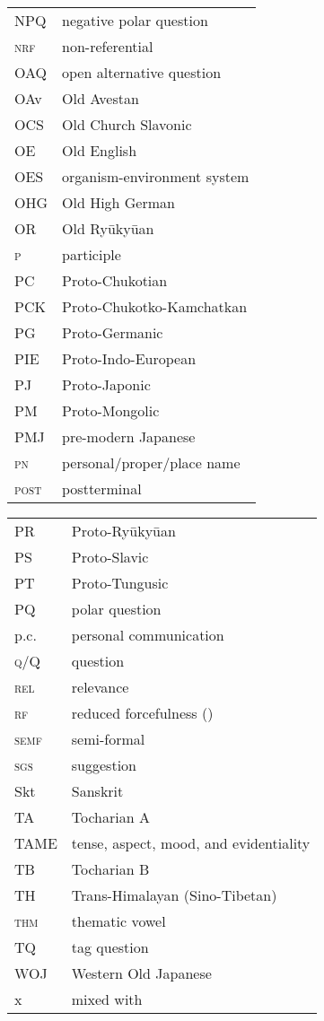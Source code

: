 \begin{tabularx}{.45\textwidth}{lQ} 
NPQ & negative {polar question}\\
\textsc{nrf} & non-referential \citep{Huang1996}\\
OAQ & open {alternative question}\\
OAv & Old {Avestan}\\
OCS & {Old Church Slavonic}\\
OE & Old {English}\\
OES & {organism-environment system}\\
OHG & Old High {German}\\
OR & Old Ry\=uky\=uan\\
\textsc{p} & participle\\
PC & Proto-{Chukotian}\\
PCK & Proto-{Chukotko-Kamchatkan}\\
PG & Proto-{Germanic}\\
PIE & {Proto-Indo-European}\\
PJ & {Proto-Japonic}\\
PM & Proto-{Mongolic}\\
PMJ & pre-modern {Japanese}\\
\textsc{pn} & personal/proper/place name\\
\textsc{post} & postterminal \citep[151]{Ragagnin2011}\\
\end{tabularx}
\begin{tabularx}{.45\textwidth}{lQ}  
PR & Proto-Ry\=uky\=uan\\
PS & {Proto-Slavic}\\
PT & {Proto-Tungusic}\\
PQ & {polar question}\\
p.c. & personal communication\\
\textsc{q}/Q & question\\
\textsc{rel} & relevance \citep{Shapiro2010}\\
\textsc{rf} & reduced forcefulness (\citealt{LiThompson1981})\\
\textsc{semf} & semi-formal\\
\textsc{sgs} & suggestion \citep{Miyara2015}\\
Skt & {Sanskrit}\\
TA & {Tocharian A}\\
TAME & tense, aspect, mood, and {evidentiality}\\
TB & {Tocharian B}\\
TH & {Trans-Himalayan} ({Sino-Tibetan})\\
\textsc{thm} & thematic vowel\\
TQ & {tag question}\\
WOJ & Western {Old Japanese}\\
x & mixed with \citep{Janhunen2012b}\\ 
\end{tabularx}
